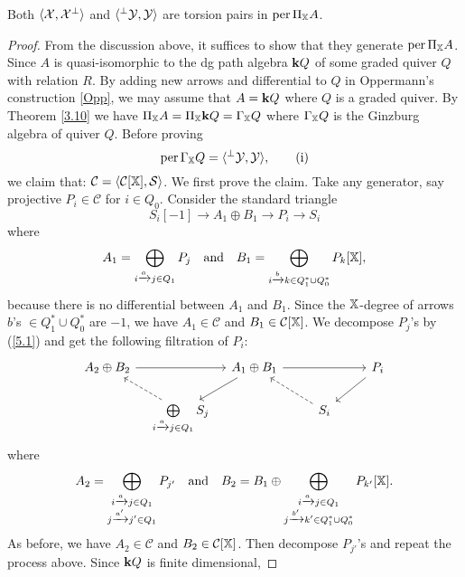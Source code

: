 \begin{proposition}
  Both $\langle \mathcal{X}, \mathcal{X}^{\bot} \rangle$
  and $\langle {}^{\bot}\mathcal{Y}, \mathcal{Y} \rangle$
  are torsion pairs in $\operatorname{per}\Pi_{\mathbb{X}}A$.
\end{proposition}
\begin{proof}
  From the discussion above,
  it suffices to show that they generate $\operatorname{per}\Pi_{\mathbb{X}}A$.
  Since $A$ is quasi-isomorphic to the dg path algebra $\mathbf{k} Q$
  of some graded quiver $Q$ with relation $R$.
  By adding new arrows and differential to $Q$ in Oppermann's construction \ref{Opp},
  we may assume that $A = \mathbf{k} Q$ where $Q$ is a graded quiver.
  By Theorem \ref{3.10} we have $\Pi_{\mathbb{X}} A = \Pi_{\mathbb{X}} \mathbf{k} Q = \Gamma_{\mathbb{X}}Q$
  where $\Gamma_{\mathbb{X}}Q$ is the Ginzburg algebra of quiver $Q$. Before proving
  \[
    \operatorname{per}\Gamma_{\mathbb{X}}Q = \langle {}^\bot\mathcal{Y}, \mathcal{Y} \rangle, \tag{i}
  \]
  we claim that: $\mathcal{C} = \langle \operatorname{\mathcal{C}}[\mathbb{X}], \mathcal{S} \rangle$.
  We first prove the claim.
  Take any generator, say projective $P_i \in \mathcal{C}$ for $i \in Q_0$.
  Consider the standard triangle
  \begin{equation}\label{5.1}
    S_i[-1] \to A_1 \oplus B_1 \to P_i \to S_i
  \end{equation}
  where
  \[
    A_1 = \bigoplus_{i \xrightarrow{a} j \in Q_1} P_j
    \quad \text{and} \quad
    B_1 = \bigoplus_{i \xrightarrow{b} k \in Q_1^*\cup Q_0^*} P_k[\mathbb{X}],
  \]
  because there is no differential between $A_1$ and $B_1$.
  Since the $\mathbb{X}$-degree of arrows $b$'s $\in Q_1^*\cup Q_0^*$ are $-1$,
  we have $A_1 \in \mathcal{C} $ and $B_1 \in \operatorname{\mathcal{C}}[\mathbb{X}]$.
  We decompose $P_j$'s by (\ref{5.1}) and get the following filtration of $P_i$:
  \[
    \begin{tikzcd}
      A_2 \oplus B_2 \ar[rr]
      &[-15pt] &[-15pt] A_1 \oplus B_1 \ar[rr] \ar[dl]
      & & P_i \ar[dl] \\
      & \bigoplus\limits_{i \xrightarrow{a} j \in Q_1} S_j \ar[ul, dashed]
      & & S_i \ar[ul, dashed]
    \end{tikzcd}
  \]
  where
  \[
    A_2 = \bigoplus_{\substack{
      i \xrightarrow{a} j \in Q_1 \\ j \xrightarrow{a'} j' \in Q_1
    }} P_{j'}
    \quad \text{and} \quad
    B_2 = B_1 \oplus \bigoplus_{\substack{
      i \xrightarrow{a} j \in Q_1 \\ j \xrightarrow{b'} k' \in Q_1^*\cup Q_0^*
    }}P_{k'}[\mathbb{X}].
  \]
  As before, we have $A_2 \in \mathcal{C} $ and $B_2 \in \operatorname{\mathcal{C}}[\mathbb{X}]$.
  Then decompose $P_{j'}$'s and repeat the process above.
  Since $\mathbf{k} Q$ is finite dimensional,

\end{proof}
